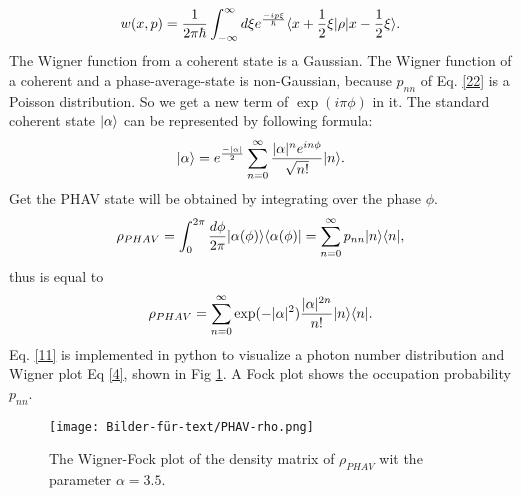 \documentclass[12pt,a4paper]{article}
\DeclarePairedDelimiter\bra{\langle}{\rvert}
\DeclarePairedDelimiter\ket{\lvert}{\rangle}
\begin{document}
\begin{equation}
w(x,p)=\frac{1}{2\pi \hbar}\int_{- \infty}^{\infty} d\xi e^{\frac{-i p \xi}{\hbar}}\bra{x+\frac{1}{2}\xi}\rho\ket{x-\frac{1}{2}\xi}.\label{4}
\end{equation}
The Wigner function from a coherent state is a Gaussian. The Wigner function of a coherent and a phase-average-state is non-Gaussian, because $p_{nn} $ of Eq. \eqref{22}  is a  Poisson distribution. 
 So we get a new term of $\exp(i\pi\phi)$ in it. 
The standard coherent state $\ket{\alpha}$ can be represented by following formula: 
\begin{equation}
\ket{\alpha}=e^{\frac{-|\alpha|}{2}}\sum_{n=0}^{\infty}\frac{|\alpha|^n e^{in\phi}}{\sqrt{n!}} \ket{n}.
\end{equation}
Get the PHAV state will be obtained by integrating over the phase $\phi$.
\begin{equation}
\rho_{PHAV}=\int_0 ^{2\pi}\frac{d\phi}{2\pi}\ket{\alpha(\phi)}\bra{\alpha(\phi)}=\sum_{n=0}^{\infty}p_{nn}\ket{n}\bra{n},\label{22}
\end{equation}
thus is equal to
\begin{equation}
\rho_{PHAV}= \sum_{n=0}^{\infty}\exp(-|\alpha|^2)\frac{|\alpha|^{2n}}{n!} \ket{n}\bra{n}.\label{11}
\end{equation}
Eq. \eqref{11} is implemented in python to visualize a photon number distribution and Wigner plot  Eq \eqref{4}, shown in Fig \ref{21}.
A Fock plot shows the occupation probability $p_{nn}$.


\begin{figure}[hbtp]
\hspace{-1.4cm}
\texttt{[image: Bilder-für-text/PHAV-rho.png]}\label{21}
\caption{The Wigner-Fock plot of the density matrix of $\rho_{PHAV}$ wit the parameter $\alpha=3.5$.}
\end{figure}
\end{document}
